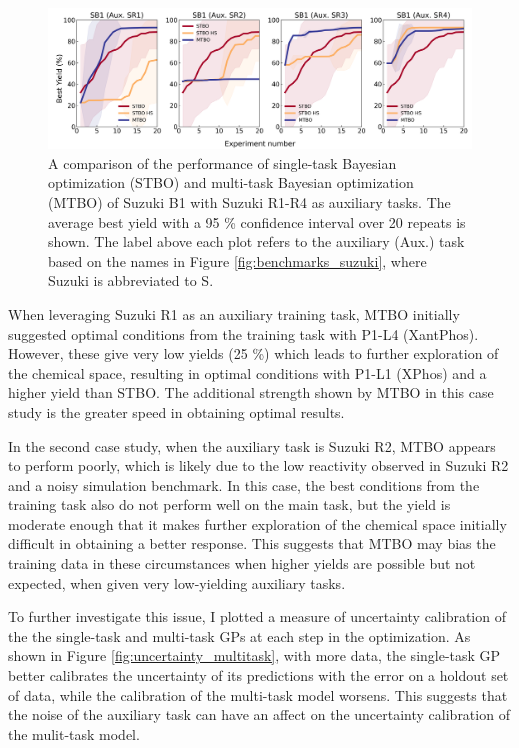 \begin{figure}
    \centering
    \includegraphics[width=1.2\textwidth]{gfx/Chapter04/baumgartner_suzuki_reizman_suzuki_one_cotraining_optimization.png}
    \caption{A comparison of the performance of single-task Bayesian optimization (STBO) and multi-task Bayesian optimization (MTBO) of Suzuki B1 with Suzuki R1-R4 as auxiliary tasks. The average best yield with a 95 \% confidence interval over 20 repeats is shown. The label above each plot refers to the auxiliary (Aux.) task based on the names in Figure \ref{fig:benchmarks_suzuki}, where Suzuki is abbreviated to S.}
    \label{fig:baumgartner_multitask}
\end{figure}

When leveraging Suzuki R1 as an auxiliary training task, MTBO initially suggested optimal conditions from the training task with P1-L4 (XantPhos). However, these give very low yields (25 \%) which leads to further exploration of the chemical space, resulting in optimal conditions with P1-L1 (XPhos) and a higher yield than STBO. The additional strength shown by MTBO in this case study is the greater speed in obtaining optimal results.

In the second case study, when the auxiliary task is Suzuki R2, MTBO appears to perform poorly, which is likely due to the low reactivity observed in Suzuki R2 and a noisy simulation benchmark. In this case, the best conditions from the training task also do not perform well on the main task, but the yield is moderate enough that it makes further exploration of the chemical space initially difficult in obtaining a better response. This suggests that MTBO may bias the training data in these circumstances when higher yields are possible but not expected, when given very low-yielding auxiliary tasks. 

To further investigate this issue, I plotted a measure of uncertainty calibration of the the single-task and multi-task GPs at each step in the optimization. As shown in Figure  \ref{fig:uncertainty_multitask}, with more data, the single-task GP better calibrates the uncertainty of its predictions with the error on a holdout set of data, while the calibration of the multi-task model worsens. This suggests that the noise of the auxiliary task can have an affect on the uncertainty calibration of the mulit-task model.

